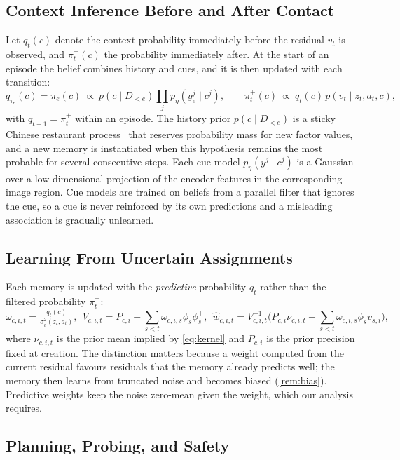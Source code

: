 \subsection{Context Inference Before and After Contact}
Let $q_t(c)$ denote the context probability immediately before the residual $v_t$ is observed, and $\pi_t^+(c)$ the probability immediately after. At the start of an episode the belief combines history and cues, and it is then updated with each transition:
\begin{equation}\label{eq:cue}
  q_{\tau_e}(c)=\pi_e(c)\ \propto\ p(c\mid D_{<e})\textstyle\prod_{j}p_\eta(y^j_e\mid c^j),\qquad
  \pi_t^+(c)\ \propto\ q_t(c)\,p(v_t\mid z_t,a_t,c),
\end{equation}
with $q_{t+1}=\pi_t^+$ within an episode. The history prior $p(c\mid D_{<e})$ is a sticky Chinese restaurant process~\citep{fox2011sticky} that reserves probability mass for new factor values, and a new memory is instantiated when this hypothesis remains the most probable for several consecutive steps. Each cue model $p_\eta(y^j\mid c^j)$ is a Gaussian over a low-dimensional projection of the encoder features in the corresponding image region. Cue models are trained on beliefs from a parallel filter that ignores the cue, so a cue is never reinforced by its own predictions and a misleading association is gradually unlearned.

\subsection{Learning From Uncertain Assignments}
Each memory is updated with the \emph{predictive} probability $q_t$ rather than the filtered probability $\pi_t^+$:
\begin{equation}\label{eq:update}
  \omega_{c,i,t}=\tfrac{q_t(c)}{\sigma_i^2(z_t,a_t)},\ \
  V_{c,i,t}=P_{c,i}+\sum_{s<t}\omega_{c,i,s}\phi_s\phi_s^\top,\ \
  \widehat w_{c,i,t}=V_{c,i,t}^{-1}\Big(P_{c,i}\nu_{c,i,t}+\sum_{s<t}\omega_{c,i,s}\phi_s v_{s,i}\Big),
\end{equation}
where $\nu_{c,i,t}$ is the prior mean implied by \cref{eq:kernel} and $P_{c,i}$ is the prior precision fixed at creation. The distinction matters because a weight computed from the current residual favours residuals that the memory already predicts well; the memory then learns from truncated noise and becomes biased (\cref{rem:bias}). Predictive weights keep the noise zero-mean given the weight, which our analysis requires.

\subsection{Planning, Probing, and Safety}
